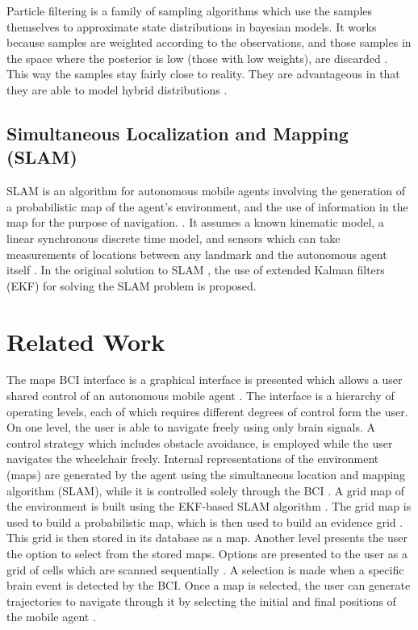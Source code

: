 \documentclass{article}
\begin{document}
Particle filtering is a family of sampling algorithms which use the samples themselves to approximate state distributions \cite{russell_artificial_2002} in bayesian models.  It works because samples are weighted according to the observations, and those samples in the space where the posterior is low (those with low weights), are discarded \cite{russell_artificial_2002}.  This way the samples stay fairly close to reality.  They are advantageous in that they are able to model hybrid distributions \cite{russell_artificial_2002}.

\subsection{Simultaneous Localization and Mapping (SLAM)}

SLAM is an algorithm for autonomous mobile agents involving the generation of a probabilistic map of the agent's environment, and the use of information in the map for the purpose of navigation. \cite{montemerlo_fastslam_2003}.  It assumes a known kinematic model, a linear synchronous discrete time model, and sensors which can take measurements of locations between any landmark and the autonomous agent itself \cite{dissanayake_solution_2001}.  In the original solution to SLAM \cite{dissanayake_solution_2001}, the use of extended Kalman filters (EKF) for solving the SLAM problem is proposed.

\section{Related Work}

The maps BCI interface is a graphical interface is presented which allows a user shared control of an autonomous mobile agent \cite{cheen_maps_2007}.  The  interface is a hierarchy of operating levels, each of which requires different degrees of control form the user.  On one level, the user is able to navigate freely using only brain signals.  A control strategy which includes obstacle avoidance, is employed while the user navigates the wheelchair freely.  Internal representations of the environment (maps) \cite{slam for domestic} are generated by the agent using the simultaneous location and mapping algorithm (SLAM), while it is controlled solely through the BCI \cite{cheen_maps_2007}.  A grid map of the environment is built using the EKF-based SLAM algorithm \cite{cheen_maps_2007}.  The grid map is used to build a probabilistic map, which is then used to build an evidence grid \cite{cheen_maps_2007}.  This grid is then stored in its database as a map.
Another level presents the user the option to select from the stored maps.  Options are presented to the user as a grid of cells which are scanned sequentially \cite{cheen_maps_2007}.  A selection is made when a specific brain event is detected by the BCI.  Once a map is selected, the user can generate trajectories to navigate through it by selecting the initial and final positions of the mobile agent \cite{cheen_maps_2007}.  
\end{document}
